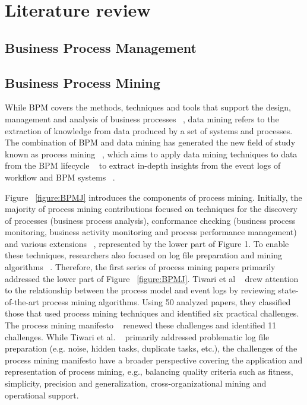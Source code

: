 \chapter{Literature review}

\section{Business Process Management}


\section{Business Process Mining}

While BPM covers the methods, techniques and tools that support the design, management and analysis of business processes ~\cite{van2003workflow}, data mining refers to the extraction of knowledge from data produced by a set of systems and processes. The combination of BPM and data mining has generated the new field of study known as process mining ~\cite{van2011process}, which aims to apply data mining techniques to data from the BPM lifecycle ~\cite{song2008trace} to extract in-depth insights from the event logs of workflow and BPM systems ~\cite{van2003workflow}.



Figure ~\ref{figure:BPMJ} introduces the components of process mining. Initially, the majority of process mining contributions focused on techniques for the discovery of processes (business process analysis), conformance checking (business process monitoring, business activity monitoring and process performance management) and various extensions ~\cite{song2008trace}, represented by the lower part of Figure 1. To enable these techniques, researchers also focused on log file preparation and mining algorithms ~\cite{weijters2006process}. Therefore, the first series of process mining papers primarily addressed the lower part of Figure ~\ref{figure:BPMJ}. Tiwari et al ~\cite{tiwari2008review} drew attention to the relationship between the process model and event logs by reviewing state-of-the-art process mining algorithms. Using 50 analyzed papers, they classified those that used process mining techniques and identified six practical challenges. The process mining manifesto ~\cite{van2012process} renewed these challenges and identified 11 challenges. While Tiwari et al. ~\cite{tiwari2008review} primarily addressed problematic log file preparation (e.g. noise, hidden tasks, duplicate tasks, etc.), the challenges of the process mining manifesto have a broader perspective covering the application and representation of process mining, e.g., balancing quality criteria such as fitness, simplicity, precision and generalization, cross-organizational mining and operational support.


